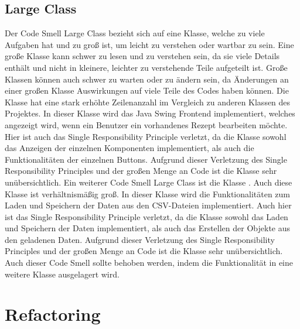 \subsection{Large Class}
Der Code Smell Large Class bezieht sich auf eine Klasse, welche zu viele Aufgaben hat und zu groß ist, um leicht zu verstehen oder wartbar zu sein. Eine große Klasse kann schwer zu lesen und zu verstehen sein, da sie viele Details enthält und nicht in kleinere, leichter zu verstehende Teile aufgeteilt ist. Große Klassen können auch schwer zu warten oder zu ändern sein, da Änderungen an einer großen Klasse Auswirkungen auf viele Teile des Codes haben können. Die Klasse \href{https://github.com/MichaelaHaag/RezeptApp/blob/main/0-Plugins/src/main/java/de/rezeptapp/plugins/gui/RezeptBearbeiten.java}{} hat eine stark erhöhte Zeilenanzahl im Vergleich zu anderen Klassen des Projektes. In dieser Klasse wird das Java Swing Frontend implementiert, welches angezeigt wird, wenn ein Benutzer ein vorhandenes Rezept bearbeiten möchte. Hier ist auch das Single Responsibility Principle verletzt, da die Klasse sowohl das Anzeigen der einzelnen Komponenten implementiert, als auch die Funktionalitäten der einzelnen Buttons. Aufgrund dieser Verletzung des Single Responsibility Principles und der großen Menge an Code ist die Klasse sehr unübersichtlich. Ein weiterer Code Smell Large Class ist die Klasse \href{https://github.com/MichaelaHaag/RezeptApp/blob/main/1-Adapter/src/main/java/de/rezeptapp/adapter/Datenpersistenz/DataReader.java}{}. Auch diese Klasse ist verhältnismäßig groß. In dieser Klasse wird die Funktionalitäten zum Laden und Speichern der Daten aus den CSV-Dateien implementiert. Auch hier ist das Single Responsibility Principle verletzt, da die Klasse sowohl das Laden und Speichern der Daten implementiert, als auch das Erstellen der Objekte aus den geladenen Daten. Aufgrund dieser Verletzung des Single Responsibility Principles und der großen Menge an Code ist die Klasse sehr unübersichtlich. Auch dieser Code Smell sollte behoben werden, indem die Funktionalität in eine weitere Klasse ausgelagert wird.

\section{Refactoring}
